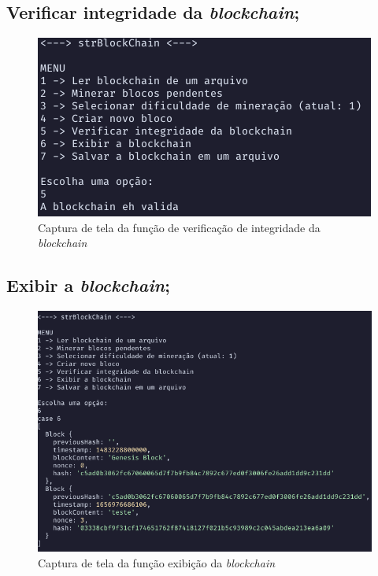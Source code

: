 \documentclass{article}
\begin{document}
\subsection{Verificar integridade da \textit{blockchain};}
\begin{figure}[H]
  \begin{center}
    \includegraphics[scale=0.5]{verifyChain.png}
    \caption{Captura de tela da função de verificação de integridade da \textit{blockchain}}
  \end{center}
\end{figure}

\subsection{Exibir a \textit{blockchain};}

\begin{figure}[H]
\begin{center}
  \includegraphics[scale=0.5]{showChain.png}
\end{center}\caption{Captura de tela da função exibição da \textit
  {blockchain}}
\end{figure}
\end{document}
